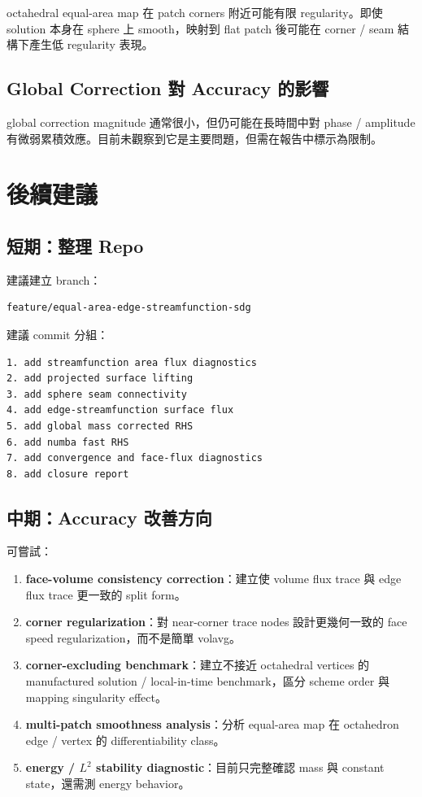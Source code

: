 \documentclass[UTF8,12pt,a4paper]{ctexart}
\begin{document}
octahedral equal-area map 在 patch corners 附近可能有限 regularity。即使 solution 本身在 sphere 上 smooth，映射到 flat patch 後可能在 corner / seam 結構下產生低 regularity 表現。

\subsection{Global Correction 對 Accuracy 的影響}

global correction magnitude 通常很小，但仍可能在長時間中對 phase / amplitude 有微弱累積效應。目前未觀察到它是主要問題，但需在報告中標示為限制。

\section{後續建議}

\subsection{短期：整理 Repo}

建議建立 branch：
\begin{lstlisting}[style=repo]
feature/equal-area-edge-streamfunction-sdg
\end{lstlisting}

建議 commit 分組：
\begin{lstlisting}[style=repo]
1. add streamfunction area flux diagnostics
2. add projected surface lifting
3. add sphere seam connectivity
4. add edge-streamfunction surface flux
5. add global mass corrected RHS
6. add numba fast RHS
7. add convergence and face-flux diagnostics
8. add closure report
\end{lstlisting}

\subsection{中期：Accuracy 改善方向}

可嘗試：
\begin{enumerate}
  \item \textbf{face-volume consistency correction}：建立使 volume flux trace 與 edge flux trace 更一致的 split form。
  \item \textbf{corner regularization}：對 near-corner trace nodes 設計更幾何一致的 face speed regularization，而不是簡單 volavg。
  \item \textbf{corner-excluding benchmark}：建立不接近 octahedral vertices 的 manufactured solution / local-in-time benchmark，區分 scheme order 與 mapping singularity effect。
  \item \textbf{multi-patch smoothness analysis}：分析 equal-area map 在 octahedron edge / vertex 的 differentiability class。
  \item \textbf{energy / $L^2$ stability diagnostic}：目前只完整確認 mass 與 constant state，還需測 energy behavior。
\end{enumerate}
\end{document}
